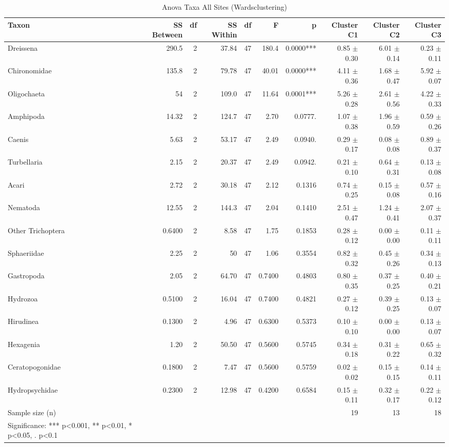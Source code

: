 \begin{table}[htbp]
  \centering
  \caption{Anova Taxa All Sites (Wardsclustering)}
  \label{tab:WardsClustering_tables_anova_taxa_all_sites}
  \small
  \begin{tabular}{lrrrrrrrrr}
    \toprule
    Taxon & SS Between & df & SS Within & df  & F & p & Cluster C1 & Cluster C2 & Cluster C3 \\
    \midrule
    Dreissena & 290.5 & 2 & 37.84 & 47 & 180.4 & 0.0000*** & 0.85 $\pm$ 0.30 & 6.01 $\pm$ 0.14 & 0.23 $\pm$ 0.11 \\
    Chironomidae & 135.8 & 2 & 79.78 & 47 & 40.01 & 0.0000*** & 4.11 $\pm$ 0.36 & 1.68 $\pm$ 0.47 & 5.92 $\pm$ 0.07 \\
    Oligochaeta & 54 & 2 & 109.0 & 47 & 11.64 & 0.0001*** & 5.26 $\pm$ 0.28 & 2.61 $\pm$ 0.56 & 4.22 $\pm$ 0.33 \\
    Amphipoda & 14.32 & 2 & 124.7 & 47 & 2.70 & 0.0777. & 1.07 $\pm$ 0.38 & 1.96 $\pm$ 0.59 & 0.59 $\pm$ 0.26 \\
    Caenis & 5.63 & 2 & 53.17 & 47 & 2.49 & 0.0940. & 0.29 $\pm$ 0.17 & 0.08 $\pm$ 0.08 & 0.89 $\pm$ 0.37 \\
    Turbellaria & 2.15 & 2 & 20.37 & 47 & 2.49 & 0.0942. & 0.21 $\pm$ 0.10 & 0.64 $\pm$ 0.31 & 0.13 $\pm$ 0.08 \\
    Acari & 2.72 & 2 & 30.18 & 47 & 2.12 & 0.1316 & 0.74 $\pm$ 0.25 & 0.15 $\pm$ 0.08 & 0.57 $\pm$ 0.16 \\
    Nematoda & 12.55 & 2 & 144.3 & 47 & 2.04 & 0.1410 & 2.51 $\pm$ 0.47 & 1.24 $\pm$ 0.41 & 2.07 $\pm$ 0.37 \\
    Other Trichoptera & 0.6400 & 2 & 8.58 & 47 & 1.75 & 0.1853 & 0.28 $\pm$ 0.12 & 0.00 $\pm$ 0.00 & 0.11 $\pm$ 0.11 \\
    Sphaeriidae & 2.25 & 2 & 50 & 47 & 1.06 & 0.3554 & 0.82 $\pm$ 0.32 & 0.45 $\pm$ 0.26 & 0.34 $\pm$ 0.13 \\
    Gastropoda & 2.05 & 2 & 64.70 & 47 & 0.7400 & 0.4803 & 0.80 $\pm$ 0.35 & 0.37 $\pm$ 0.25 & 0.40 $\pm$ 0.21 \\
    Hydrozoa & 0.5100 & 2 & 16.04 & 47 & 0.7400 & 0.4821 & 0.27 $\pm$ 0.12 & 0.39 $\pm$ 0.25 & 0.13 $\pm$ 0.07 \\
    Hirudinea & 0.1300 & 2 & 4.96 & 47 & 0.6300 & 0.5373 & 0.10 $\pm$ 0.10 & 0.00 $\pm$ 0.00 & 0.13 $\pm$ 0.07 \\
    Hexagenia & 1.20 & 2 & 50.50 & 47 & 0.5600 & 0.5745 & 0.34 $\pm$ 0.18 & 0.31 $\pm$ 0.22 & 0.65 $\pm$ 0.32 \\
    Ceratopogonidae & 0.1800 & 2 & 7.47 & 47 & 0.5600 & 0.5759 & 0.02 $\pm$ 0.02 & 0.15 $\pm$ 0.15 & 0.14 $\pm$ 0.11 \\
    Hydropsychidae & 0.2300 & 2 & 12.98 & 47 & 0.4200 & 0.6584 & 0.15 $\pm$ 0.11 & 0.32 $\pm$ 0.17 & 0.22 $\pm$ 0.12 \\
    Sample size (n) &  &  &  &  &  &  & 19 & 13 & 18 \\
    Significance: *** p<0.001, ** p<0.01, * p<0.05, . p<0.1 &  &  &  &  &  &  &  &  &  \\
    \bottomrule
  \end{tabular}
\end{table}
